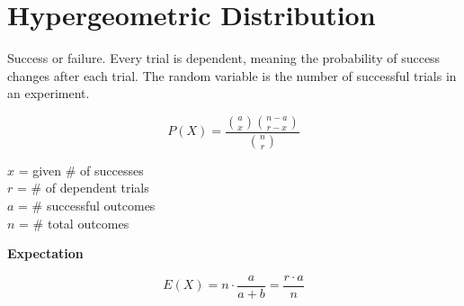 \documentclass{article}
\begin{document}
\section{Hypergeometric Distribution}
Success or failure. Every trial is dependent, meaning the probability of success changes after each trial. The random variable is the number of successful trials in an experiment.\\
\noindent
\begin{minipage}[t]{0.5\textwidth}
\[P(X) = \frac{\binom{a}{x}\binom{n-a}{r-x}}{\binom{n}{r}}\]
\begin{center}
    \(x\) = given \# of successes\\
    \(r\) = \# of dependent trials\\
    \(a\) = \# successful outcomes\\
    \(n\) = \# total outcomes
\end{center}
\end{minipage}%
\begin{minipage}[t]{0.5\textwidth}
\begin{center}
    \textbf{Expectation}
\end{center}
\[E(X) = n\cdot \frac{a}{a+b} = \frac{r\cdot a}{n}\]
\end{minipage}
\end{document}
